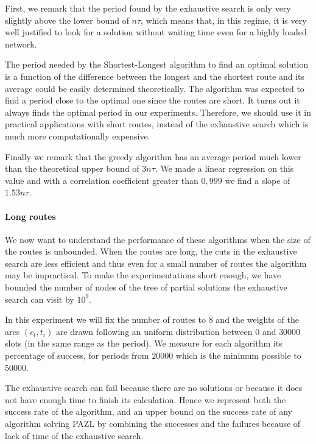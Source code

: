 \documentclass[a4paper,10pt]{article}
\begin{document}
{      First, we remark that the period found by the exhaustive search is only very slightly above the lower bound of 
      $n\tau$, which means that, in this regime, it is very well justified to look for a solution without waiting time even for a highly loaded network. 
      
      The period needed by the Shortest-Longest algorithm to find an optimal solution is a function of the difference between the longest and the shortest route and its average could be easily determined theoretically. The algorithm was expected to find a period close to the optimal one since the routes are short. It turns out it always finds the optimal period in our experiments. Therefore, we should use it in practical applications with short routes, instead of the exhaustive search which is much more computationally expensive. 
      
      Finally we remark that the greedy algorithm has an average period much lower than the theoretical upper bound of $3n\tau$. We made a linear regression on this value and with a correlation coefficient greater than $0,999$ we find a slope of $1.53n\tau$.
      
      

      \paragraph{Long routes}
      
      We now want to understand the performance of these algorithms when the size of the routes is unbounded. When the routes are long, the cuts in the exhaustive search are less efficient and thus even for a small number of routes the algorithm may be impractical. To make the experimentations short enough, we have bounded the number of nodes of the tree of partial solutions the exhaustive search can visit by $10^9$.
      
      In this experiment we will fix the number of routes to $8$ and the weights of the arcs $(c_t,t_i)$ are drawn following an uniform distribution between $0$ and $30000$ slots (in the same range as the period).
      We measure for each algorithm its percentage of success, for periods from $20000$ which is the minimum possible to $50000$.
      
      The exhaustive search can fail because there are no solutions or because it does not have enough time to finish its calculation. Hence we represent both the success rate of the algorithm, and an upper bound on the success rate of any algorithm solving PAZL by combining the successes and the failures because of lack of time of the exhaustive search. 
      
}
\end{document}
